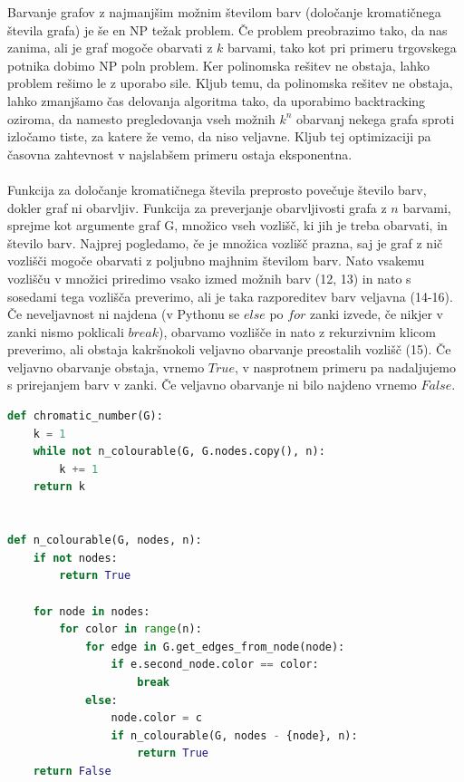 \documentclass[11pt]{article}
\begin{document}
Barvanje grafov z najmanjšim možnim številom barv (določanje kromatičnega števila grafa) je še en NP težak problem. Če problem preobrazimo tako, da nas zanima, ali je graf mogoče obarvati z $k$ barvami, tako kot pri primeru trgovskega potnika dobimo NP poln problem. Ker polinomska rešitev ne obstaja, lahko problem rešimo le z uporabo sile. Kljub temu, da polinomska rešitev ne obstaja, lahko zmanjšamo čas delovanja algoritma tako, da uporabimo backtracking oziroma, da namesto pregledovanja vseh možnih $k^n$ obarvanj nekega grafa sproti izločamo tiste, za katere že vemo, da niso veljavne. Kljub tej optimizaciji pa časovna zahtevnost v najslabšem primeru ostaja eksponentna.
\\ \\
Funkcija za določanje kromatičnega števila preprosto povečuje število barv, dokler graf ni obarvljiv. Funkcija za preverjanje obarvljivosti grafa z $n$ barvami, sprejme kot argumente graf G, množico vseh vozlišč, ki jih je treba obarvati, in število barv. Najprej pogledamo, če je množica vozlišč prazna, saj je graf z nič vozlišči mogoče obarvati z poljubno majhnim številom barv. Nato vsakemu vozlišču v množici priredimo vsako izmed možnih barv (12, 13) in nato s sosedami tega vozlišča preverimo, ali je taka razporeditev barv veljavna (14-16). Če neveljavnost ni najdena (v Pythonu se $else$ po $for$ zanki izvede, če nikjer v zanki nismo poklicali $break$), obarvamo vozlišče in nato z rekurzivnim klicom preverimo, ali obstaja kakršnokoli veljavno obarvanje preostalih vozlišč (15). Če veljavno obarvanje obstaja, vrnemo $True$, v nasprotnem primeru pa nadaljujemo s prirejanjem barv v zanki. Če veljavno obarvanje ni bilo najdeno vrnemo $False$. \cite{coloring}


\begin{lstlisting}[language=Python, caption=Določanje kromatičnega števila grafa]
def chromatic_number(G):
    k = 1    
    while not n_colourable(G, G.nodes.copy(), n):
        k += 1
    return k
    
    
def n_colourable(G, nodes, n):
    if not nodes:
        return True
    
    for node in nodes:
        for color in range(n):
            for edge in G.get_edges_from_node(node):
                if e.second_node.color == color:
                    break
            else:
                node.color = c
                if n_colourable(G, nodes - {node}, n):
                    return True
    return False

\end{lstlisting}
\end{document}
